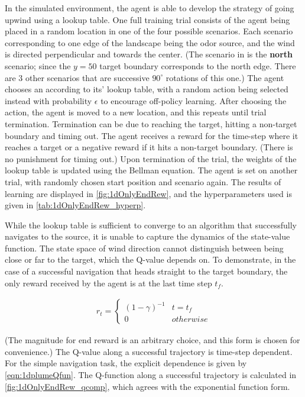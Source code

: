 \documentclass[../dissertation.tex]{subfiles}
\begin{document}
In the simulated environment, the agent is able to develop the strategy of going upwind using a lookup table.
One full training trial consists of the agent being placed in a random location in one of the four possible scenarios.
Each scenario corresponding to one edge of the landscape being the odor source, and the wind is directed perpendicular and towards the center.
(The scenario in  is the \textbf{north} scenario; since the $y=50$ target boundary corresponds to the north edge.
There are 3 other scenarios that are successive $90^{\circ}$ rotations of this one.)
The agent chooses an according to its' lookup table, with a random action being selected instead with probability $\epsilon$ to encourage off-policy learning.
After choosing the action, the agent is moved to a new location, and this repeats until trial termination.
Termination can be due to reaching the target, hitting a non-target boundary and timing out.
The agent receives a reward for the time-step where it reaches a target or a negative reward if it hits a non-target boundary.
(There is no punishment for timing out.)
Upon termination of the trial, the weights of the lookup table is updated using the Bellman equation.
The agent is set on another trial, with randomly chosen start position and scenario again.
The results of learning are displayed in \cref{fig:1dOnlyEndRew}, and the hyperparameters used is given in \cref{tab:1dOnlyEndRew_hyperp}.

While the lookup table is sufficient to converge to an algorithm that successfully navigates to the source, it is unable to capture the dynamics of the state-value function.
The state space of wind direction cannot distinguish between being close or far to the target, which the Q-value depends on.
To demonstrate, in the case of a successful navigation that heads straight to the target boundary, the only reward received by the agent is at the last time step $t_{f}$.

\begin{align} \label{eqn:1dplumeRews}
    r_t =
        \begin{cases}
            \left( 1 - \gamma \right)^{-1}  &   t = t_{f} \\
            0                               &   otherwise
        \end{cases}
\end{align}

(The magnitude for end reward is an arbitrary choice, and this form is chosen for convenience.)
The Q-value along a successful trajectory is time-step dependent.
For the simple navigation task, the explicit dependence is given by \cref{eqn:1dplumeQfun}.
The Q-function along a successful trajectory is calculated in \cref{fig:1dOnlyEndRew_qcomp}, which agrees with the exponential function form.
\end{document}
